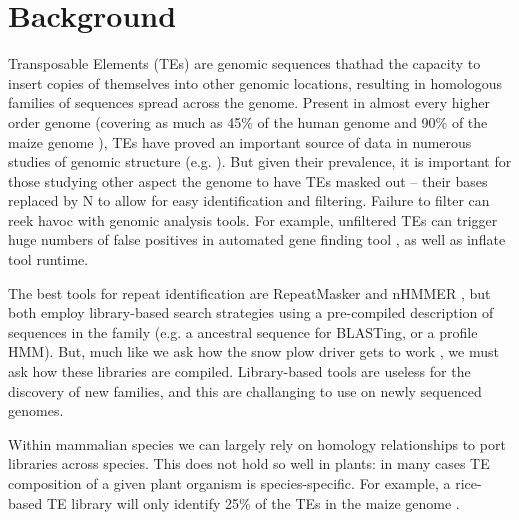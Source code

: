 \documentclass{bmcart}
\begin{document}
\section*{Background}
Transposable Elements (TEs) are genomic sequences thathad the capacity
to insert copies of themselves into other genomic locations, resulting
in homologous families of sequences spread across the genome.  Present
in almost every higher order genome (covering as much as 45\% of the
human genome and 90\% of the maize genome
\cite{Venter:2001p92,SanMiguel:1996wa}), TEs have proved an important
source of data in numerous studies of genomic structure (e.g.
\cite{Arndt:2005p279,Karro:2008p123,Mugal:2009p581,Hardison:2003p97}).
But given their prevalence, it is important for those studying other
aspect the genome to have TEs masked out -- their bases replaced by N
to allow for easy identification and filtering.  Failure to filter can
reek havoc with genomic analysis tools.  For example, unfiltered TEs can trigger
huge numbers of false positives in automated gene finding tool
\cite{Jiang:2013jt}, as well as inflate tool runtime.

The best tools for repeat identification are RepeatMasker and nHMMER
\cite{RepeatMaskerOpen:XkNxXSd7,Wheeler:2013gj}, but both employ 
library-based search strategies using a pre-compiled
description of sequences in the family (e.g. a ancestral sequence for
BLASTing, or a profile HMM).  But, much like we ask how
the snow plow driver gets to work \cite{Pratchett:uw}, we must ask how
these libraries are compiled.  Library-based tools
are useless for the discovery of new families, and this are
challanging to use on newly sequenced genomes.



Within mammalian species we can largely rely on homology relationships
to port libraries across species.  This does not hold
so well in plants: in many cases TE composition of a given plant
organism is species-specific.  For example, a rice-based TE library
will only identify 25\% of the TEs in the maize genome
\cite{Jiang:2013jt}.
\end{document}
